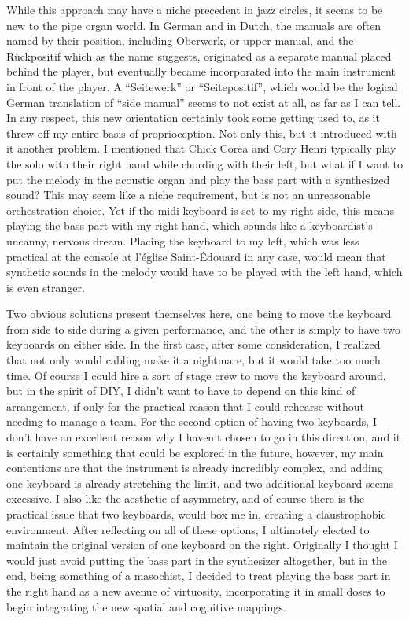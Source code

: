 \documentclass[12pt,twoside,maitrise]{dms}
\theoremstyle{definition}
\begin{document}
While this approach may have a niche precedent in jazz circles, it seems to be new to the pipe organ world. In German and in Dutch, the manuals are often named by their position, including Oberwerk, or upper manual, and the Rückpositif which as the name suggests, originated as a separate manual placed behind the player, but eventually became incorporated into the main instrument in front of the player. A “Seitewerk” or “Seitepositif”, which would be the logical German translation of “side manual” seems to not exist at all, as far as I can tell. In any respect, this new orientation certainly took some getting used to, as it threw off my entire basis of proprioception. Not only this, but it introduced with it another problem. I mentioned that Chick Corea and Cory Henri typically play the solo with their right hand while chording with their left, but what if I want to put the melody in the acoustic organ and play the bass part with a synthesized sound? This may seem like a niche requirement, but is not an unreasonable orchestration choice. Yet if the midi keyboard is set to my right side, this means playing the bass part with my right hand, which sounds like a keyboardist’s uncanny, nervous dream. Placing the keyboard to my left, which was less practical at the console at l’église Saint-Édouard in any case, would mean that synthetic sounds in the melody would have to be played with the left hand, which is even stranger. 

Two obvious solutions present themselves here, one being to move the keyboard from side to side during a given performance, and the other is simply to have two keyboards on either side. In the first case, after some consideration, I realized that not only would cabling make it a nightmare, but it would take too much time. Of course I could hire a sort of stage crew to move the keyboard around, but in the spirit of DIY, I didn’t want to have to depend on this kind of arrangement, if only for the practical reason that I could rehearse without needing to manage a team. For the second option of having two keyboards, I don’t have an excellent reason why I haven’t chosen to go in this direction, and it is certainly something that could be explored in the future, however, my main contentions are that the instrument is already incredibly complex, and adding one keyboard is already stretching the limit, and two additional keyboard seems excessive. I also like the aesthetic of asymmetry, and of course there is the practical issue that two keyboards, would box me in, creating a claustrophobic environment. After reflecting on all of these options, I ultimately elected to maintain the original version of one keyboard on the right. Originally I thought I would just avoid putting the bass part in the synthesizer altogether, but in the end, being something of a masochist, I decided to treat playing the bass part in the right hand as a new avenue of virtuosity, incorporating it in small doses to begin integrating the new spatial and cognitive mappings.
\end{document}
